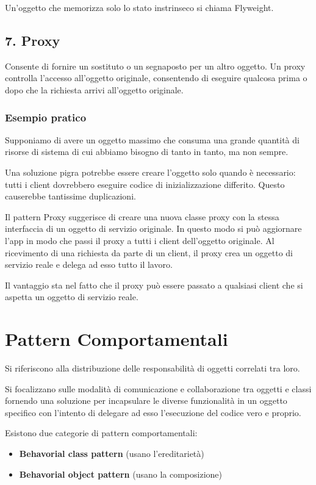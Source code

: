 \documentclass{report}
\begin{document}
\noindent
Un'oggetto che memorizza solo lo stato instrinseco si chiama Flyweight.

\subsection*{7. Proxy}
Consente di fornire un sostituto o un segnaposto per un altro oggetto. Un proxy controlla l'accesso all'oggetto originale, consentendo di eseguire qualcosa prima o dopo che la richiesta arrivi all'oggetto originale.

\subsubsection*{Esempio pratico}
Supponiamo di avere un oggetto massimo che consuma una grande quantità di risorse di sistema di cui abbiamo bisogno di tanto in tanto, ma non sempre.

\noindent
Una soluzione pigra potrebbe essere creare l'oggetto solo quando è necessario: tutti i client dovrebbero eseguire codice di inizializzazione differito. Questo causerebbe tantissime duplicazioni.

\medskip
\noindent
Il pattern Proxy suggerisce di creare una nuova classe proxy con la stessa interfaccia di un oggetto di servizio originale. In questo modo si può aggiornare l'app in modo che passi il proxy a tutti i client dell'oggetto originale.
Al ricevimento di una richiesta da parte di un client, il proxy crea un oggetto di servizio reale e delega ad esso tutto il lavoro.

\noindent
Il vantaggio sta nel fatto che il proxy può essere passato a qualsiasi client che si aspetta un oggetto di servizio reale.

\section{Pattern Comportamentali}
Si riferiscono alla distribuzione delle responsabilità di oggetti correlati tra loro.

\noindent
Si focalizzano sulle modalità di comunicazione e collaborazione tra oggetti e classi fornendo una soluzione per incapsulare le diverse funzionalità in un oggetto specifico con l'intento di delegare ad esso l'esecuzione del codice vero e proprio.

\smallskip
\noindent
Esistono due categorie di pattern comportamentali:
\begin{itemize}
    \item \textbf{Behavorial class pattern} (usano l'ereditarietà)
    \item \textbf{Behavorial object pattern} (usano la composizione)
\end{itemize}
\end{document}
